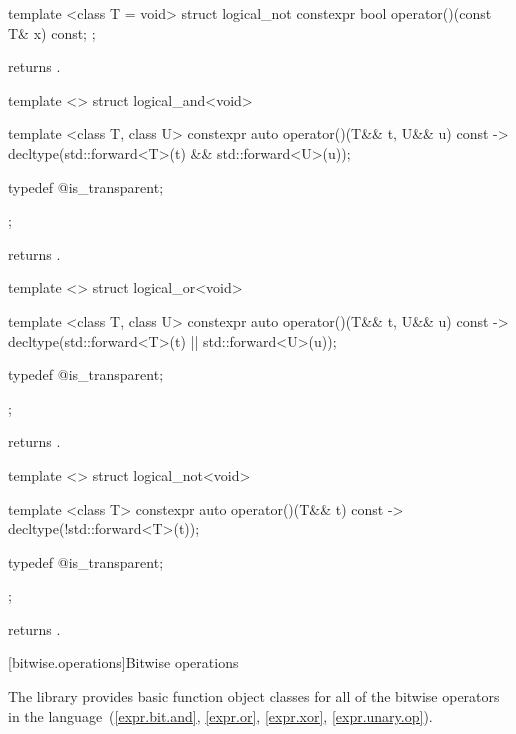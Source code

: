 %
\begin{itemdecl}
template <class T = void> struct logical_not {
  constexpr bool operator()(const T& x) const;
};
\end{itemdecl}

\begin{itemdescr}
\pnum
{} returns .
\end{itemdescr}

%
\begin{itemdecl}
template <> struct logical_and<void> {
  template <class T, class U> constexpr auto operator()(T&& t, U&& u) const
    -> decltype(std::forward<T>(t) && std::forward<U>(u));

  typedef @\unspec@ is_transparent;
};
\end{itemdecl}

\begin{itemdescr}
\pnum
{} returns .
\end{itemdescr}

%
\begin{itemdecl}
template <> struct logical_or<void> {
  template <class T, class U> constexpr auto operator()(T&& t, U&& u) const
    -> decltype(std::forward<T>(t) || std::forward<U>(u));

  typedef @\unspec@ is_transparent;
};
\end{itemdecl}

\begin{itemdescr}
\pnum
{} returns .
\end{itemdescr}

%
\begin{itemdecl}
template <> struct logical_not<void> {
  template <class T> constexpr auto operator()(T&& t) const
    -> decltype(!std::forward<T>(t));

  typedef @\unspec@ is_transparent;
};
\end{itemdecl}

\begin{itemdescr}
\pnum
{} returns .
\end{itemdescr}


[bitwise.operations]{Bitwise operations}

\pnum
The library provides basic function object classes for all of the bitwise
operators in the language~(\ref{expr.bit.and}, \ref{expr.or},
\ref{expr.xor}, \ref{expr.unary.op}).

